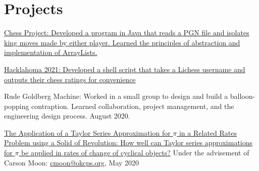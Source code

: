 \documentclass[12pt]{article}
\begin{document}
%

\section*{Projects}
\href{https://github.com/tttnguyen729/ChessProject}{Chess Project: Developed a program in Java that reads a PGN file and isolates king moves made by either player. Learned the principles of abstraction and implementation of ArrayLists.}

\href{https://github.com/tttnguyen729/lichessRatingParser}{Hacklahoma 2021: Developed a shell script that takes a Lichess username and outputs their chess ratings for convenience}

Rude Goldberg Machine: Worked in a small group to design and build a balloon-popping contraption. Learned collaboration, project management, and the engineering design process. August 2020.

\href{https://github.com/tttnguyen729/ee}{The Application of a Taylor Series Approximation for \(\pi\) in a Related Rates Problem using a Solid of Revolution: How well can Taylor series approximations for \(\pi\) be applied in rates of change of cyclical objects?} Under the advisement of Carson Moon: \href{mailto:cmoon@okcps.org}{cmoon@okcps.org}, May 2020 


\end{document}
